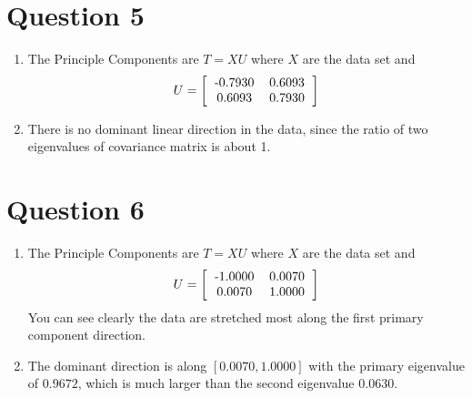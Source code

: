 \documentclass{article}
\begin{document}
\section*{Question 5}
\begin{enumerate}
  \item The Principle Components are $T = XU$ where $X$ are the data set and
  \begin{equation}
  U = \bigg[ \begin{tabular}{c c}
  -0.7930 &   0.6093 \\
  0.6093  &  0.7930 \\
\end{tabular}
 \bigg]
\end{equation}
\item There is no dominant linear direction in the data, since the ratio of two eigenvalues of covariance matrix is about 1.
  \end{enumerate}

  \section*{Question 6}
  \begin{enumerate}
    \item The Principle Components are $T = XU$ where $X$ are the data set and
    \begin{equation}
    U = \bigg[ \begin{tabular}{c c}
    -1.0000  &  0.0070 \\
 0.0070  &  1.0000 \\
  \end{tabular}
   \bigg]
  \end{equation}
  You can see clearly the data are stretched most along the first primary component direction.
  \item The dominant direction is along $[0.0070,1.0000]$ with the primary eigenvalue of $0.9672$, which is much larger than the second eigenvalue $0.0630$.
    \end{enumerate}
\end{document}
